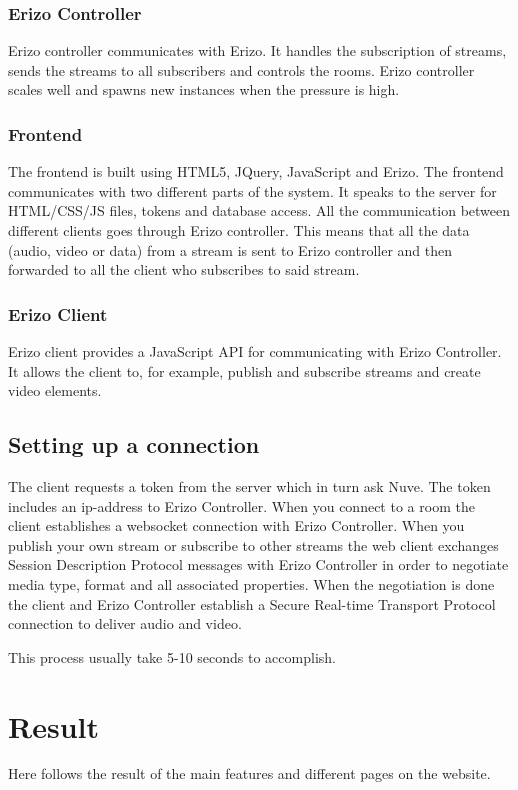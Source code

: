 \documentclass[12pt, titlepage]{article}
\begin{document}
\subsubsection{Erizo Controller}
Erizo controller communicates with Erizo. It handles the subscription of streams, sends the streams to all subscribers and controls the rooms. Erizo controller scales well and spawns new instances when the pressure is high.
\subsubsection{Frontend}
The frontend is built using HTML5, JQuery, JavaScript and Erizo. The frontend communicates with two different parts of the system. It speaks to the server for HTML/CSS/JS files, tokens and database access. All the communication between different clients goes through Erizo controller. This means that all the data (audio, video or data) from a stream is sent to Erizo controller and then forwarded to all the client who subscribes to said stream.
\subsubsection{Erizo Client}
Erizo client provides a JavaScript API for communicating with Erizo Controller. It allows the client to, for example, publish and subscribe streams and create video elements.
\subsection{Setting up a connection}
The client requests a token from the server which in turn ask Nuve. The token includes an ip-address to Erizo Controller. When you connect to a room the client establishes a websocket connection with Erizo Controller. When you publish your own stream or subscribe to other streams the web client exchanges Session Description Protocol messages with Erizo Controller in order to negotiate media type, format and all associated properties. When the negotiation is done the client and Erizo Controller establish a Secure Real-time Transport Protocol connection to deliver audio and video.

This process usually take 5-10 seconds to accomplish.
\section{Result}
Here follows the result of the main features and different pages on the website.
\end{document}
